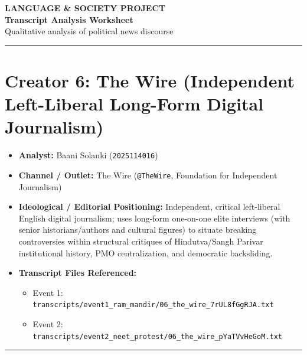 \documentclass[10pt,a4paper]{article}
\begin{document}
\begin{center}
    {\large\bfseries LANGUAGE \& SOCIETY PROJECT}\\[3pt]
    {\LARGE\bfseries Transcript Analysis Worksheet}\\[3pt]
    {\normalsize Qualitative analysis of political news discourse}
\end{center}
\vspace{2pt}
\noindent\rule{\textwidth}{0.4pt}
\vspace{4pt}


\section*{Creator 6: The Wire (Independent Left-Liberal Long-Form Digital Journalism)}
\begin{itemize}[leftmargin=1.5em, itemsep=3pt, topsep=4pt]
  \item \textbf{Analyst:} Baani Solanki (\texttt{2025114016})
  \item \textbf{Channel / Outlet:} The Wire (\texttt{@TheWire}, Foundation for Independent Journalism)
  \item \textbf{Ideological / Editorial Positioning:} Independent, critical left-liberal English digital journalism; uses long-form one-on-one elite interviews (with senior historians/authors and cultural figures) to situate breaking controversies within structural critiques of Hindutva/Sangh Parivar institutional history, PMO centralization, and democratic backsliding.
  \item \textbf{Transcript Files Referenced:}
  \begin{itemize}[leftmargin=1.4em, itemsep=2pt, topsep=2pt]
    \item Event 1: \texttt{transcripts/event1\_ram\_mandir/06\_the\_wire\_7rUL8fGgRJA.txt}
    \item Event 2: \texttt{transcripts/event2\_neet\_protest/06\_the\_wire\_pYaTVvHeGoM.txt}
  \end{itemize}
\end{itemize}
\vspace{4pt}\noindent\rule{\textwidth}{0.4pt}\vspace{4pt}
\end{document}
